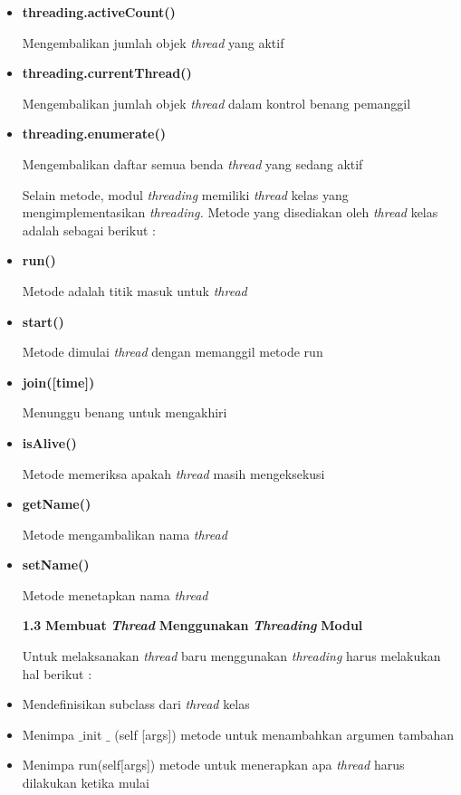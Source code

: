\documentclass[a4paper,12pt]{report}
\begin{document}
\begin{itemize}
\item \textbf{t}\textbf{hreading.activeCount() } \par
 Mengembalikan jumlah objek \textit{thread} yang aktif \par
\item \textbf{t}\textbf{hreading.currentThread() } \par
Mengembalikan jumlah objek \textit{thread} dalam kontrol benang pemanggil \par
\item \textbf{t}\textbf{hreading.enumerate() } \par
Mengembalikan daftar semua benda \textit{thread}\textit{ }yang sedang aktif \par
\vspace{12pt}
Selain metode, modul \textit{thread}\textit{ing }memiliki \textit{thread}\textit{ }kelas yang mengimplementasikan \textit{thread}\textit{ing. }Metode yang disediakan oleh \textit{thread}\textit{ }kelas adalah sebagai berikut : \par
\item \textbf{run()} \par
Metode adalah titik masuk untuk \textit{thread} \par
\item \textbf{start()} \par
Metode dimulai\textbf{ }\textit{thread}\textit{ }dengan memanggil metode run \par
\item \textbf{join(}\textbf{[time]}\textbf{)} \par
Menunggu benang untuk mengakhiri \par
\item \textbf{isAlive()} \par
Metode memeriksa apakah\textbf{ }\textit{thread}\textit{ }masih mengeksekusi\textbf{ } \par
\item \textbf{getName()} \par
Metode mengambalikan nama\textbf{ }\textit{thread} \par
\item \textbf{setName()} \par
Metode menetapkan nama\textbf{ }\textit{thread} \par
\vspace{12pt}
\textbf{1.3 }\textbf{Membuat }\textbf{\textit{Thread }}\textbf{Menggunakan }\textbf{\textit{Threading}}\textbf{ Modul} \par
Untuk melaksanakan \textit{thread}\textit{ }baru menggunakan\textit{ threading} harus melakukan hal berikut : \par
\item Mendefinisikan subclass dari \textit{thread} kelas \par
\item Menimpa  $  \_  $init $  \_  $ (self [args]) metode untuk menambahkan argumen tambahan \par
\item Menimpa run(self[args]) metode untuk menerapkan apa \textit{thread} harus dilakukan ketika mulai \end{itemize}
\end{document}
